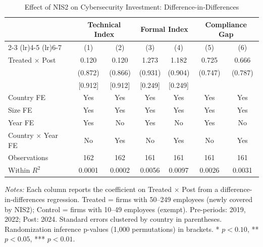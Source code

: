 \begin{table}[H]
\centering
\caption{Effect of NIS2 on Cybersecurity Investment: Difference-in-Differences}
\label{tab:main}
\begin{threeparttable}
\begin{tabular}{lcccccc}
\toprule
 & \multicolumn{2}{c}{Technical Index} & \multicolumn{2}{c}{Formal Index} & \multicolumn{2}{c}{Compliance Gap} \\
\cmidrule(lr){2-3} \cmidrule(lr){4-5} \cmidrule(lr){6-7}
 & (1) & (2) & (3) & (4) & (5) & (6) \\
\midrule
Treated $\times$ Post & 0.120 & 0.120 & 1.273 & 1.182 & 0.725 & 0.666 \\
 & (0.872) & (0.866) & (0.931) & (0.904) & (0.747) & (0.787) \\
 & [0.912] & [0.912] & [0.249] & [0.249] & & \\
\midrule
Country FE & Yes & Yes & Yes & Yes & Yes & Yes \\
Size FE & Yes & Yes & Yes & Yes & Yes & Yes \\
Year FE & Yes & No & Yes & No & Yes & No \\
Country $\times$ Year FE & No & Yes & No & Yes & No & Yes \\
Observations & 162 & 162 & 161 & 161 & 161 & 161 \\
Within $R^2$ & 0.0001 & 0.0002 & 0.0056 & 0.0097 & 0.0026 & 0.0031 \\
\bottomrule
\end{tabular}
\begin{tablenotes}[flushleft]
\small
\item \textit{Notes:} Each column reports the coefficient on Treated $\times$ Post from a difference-in-differences regression. Treated = firms with 50--249 employees (newly covered by NIS2); Control = firms with 10--49 employees (exempt). Pre-periods: 2019, 2022; Post: 2024. Standard errors clustered by country in parentheses. Randomization inference p-values (1,000 permutations) in brackets. * $p<0.10$, ** $p<0.05$, *** $p<0.01$.
\end{tablenotes}
\end{threeparttable}
\end{table}
